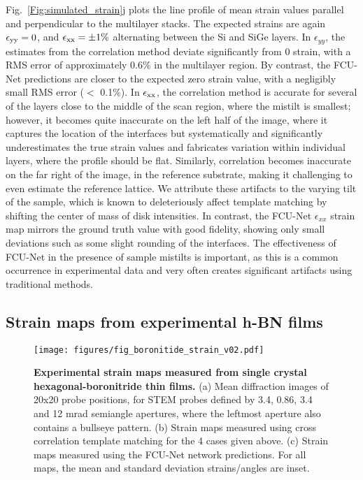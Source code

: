 \documentclass[%
 reprint,
superscriptaddress,
 amsmath,
 amssymb,
 prl,
]{revtex4-2}
\begin{document}
 Fig.~\ref{Fig:simulated_strain}j plots the line profile of mean strain values parallel and perpendicular to the multilayer stacks. The expected strains are again $\epsilon_{\rm{yy}}=0$, and $\epsilon_{\rm{xx}}=\pm1\%$ alternating between the Si and SiGe layers.  In $\epsilon_{yy}$, the estimates from the correlation method deviate significantly from 0 strain, with a RMS error of approximately $0.6\%$ in the multilayer region. By contrast, the FCU-Net predictions are closer to the expected zero strain value, with a negligibly small RMS error ($<$ 0.1\%).  In $\epsilon_{\rm{xx}}$, the correlation method is accurate for several of the layers close to the middle of the scan region, where the mistilt is smallest; however, it becomes quite inaccurate on the left half of the image, where it captures the location of the interfaces but systematically and significantly underestimates the true strain values and fabricates variation within individual layers, where the profile should be flat.  Similarly, correlation becomes inaccurate on the far right of the image, in the reference substrate, making it challenging to even estimate the reference lattice.   We attribute these artifacts to the varying tilt of the sample, which is known to deleteriously affect template matching by shifting the center of mass of disk intensities.  In contrast, the FCU-Net $\epsilon_{xx}$ strain map mirrors the ground truth value with good fidelity, showing only small deviations such as some slight rounding of the interfaces.  The effectiveness of FCU-Net in the presence of sample mistilts is important, as this is a common occurrence in experimental data and very often creates significant artifacts using traditional methods.

 

\subsection*{Strain maps from experimental h-BN films}

\begin{figure}[htbp]
    \centering
    \texttt{[image: figures/fig\_boronitide\_strain\_v02.pdf]}
    \caption{{\bf Experimental strain maps measured from single crystal hexagonal-boronitride thin films.} (a) Mean diffraction images of 20x20 probe positions, for STEM probes defined by 3.4, 0.86, 3.4 and 12 mrad semiangle apertures, where the leftmost aperture also contains a bullseye pattern. (b) Strain maps measured using cross correlation template matching for the 4 cases given above. (c) Strain maps measured using the FCU-Net network predictions. For all maps, the mean and standard deviation strains/angles are inset.}
    \label{Fig:StrainMap_hBN}
\end{figure}
\end{document}
